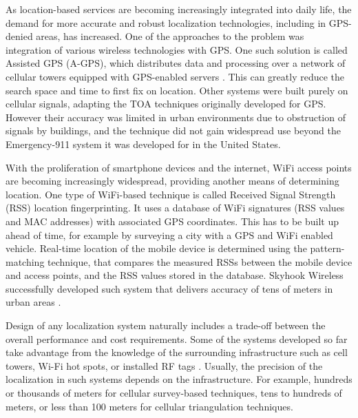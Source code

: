 As location-based services are becoming increasingly integrated into daily life,  the demand for more accurate and robust localization technologies, including in GPS-denied areas, has increased. One of the approaches to the problem was integration of various wireless technologies with GPS. One such solution is called Assisted GPS (A-GPS), which distributes data and processing over a network of cellular towers equipped with GPS-enabled servers \cite{AGPS}. This can greatly reduce the search space and time to first fix on location. Other systems were built purely on cellular signals, adapting the TOA techniques originally developed for GPS. However their accuracy was limited in urban environments due to obstruction of signals by buildings, and the technique did not gain widespread use beyond the Emergency-911 system it was developed for in the United States.


With the proliferation of smartphone devices and the internet, WiFi access points are becoming increasingly widespread, providing another means of determining location. One type of WiFi-based technique is called Received Signal Strength (RSS) location fingerprinting. It uses a database of WiFi signatures (RSS values and MAC addresses) with associated GPS coordinates. This has to be built up ahead of time, for example by surveying a city with a GPS and WiFi enabled vehicle. 
Real-time location of the mobile device is determined using the pattern-matching technique, that compares the measured RSSs between the mobile device and access points, and the RSS values stored in the database. Skyhook Wireless successfully developed such system that delivers accuracy of tens of meters in urban areas \cite{Skyhook}. 

Design of any localization system naturally includes a trade-off between the overall performance and cost requirements. Some of the systems developed so far take advantage from the knowledge of the surrounding infrastructure such as
cell towers, Wi-Fi hot spots, or installed RF tags \cite{GeoLoc}. Usually, the precision of the localization in such systems depends on the infrastructure. For example,  hundreds or thousands of meters for cellular survey-based techniques, tens to hundreds of meters, or less than 100 meters for cellular triangulation techniques.


